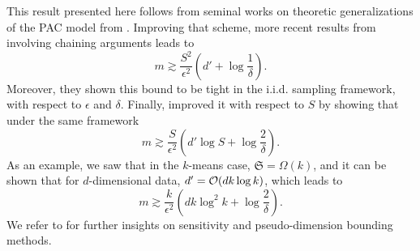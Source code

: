 This result presented here follows from seminal works on theoretic generalizations of the PAC model from \cite{haussler1992decisiontheoricgeneralizationofPACmodel}.
Improving that scheme, more recent results from \cite{li2001_improved_bound_sample_complexity} involving chaining arguments leads to
\begin{equation*}
	m \gtrsim \frac{S^{2}}{\epsilon^{2}} (d' + \log \frac{1}{\delta}).
\end{equation*}
Moreover, they shown this bound to be tight in the i.i.d. sampling framework, with respect to $\epsilon$ and $\delta$.
Finally, \cite{braverman2016coresetsota} improved it with respect to $S$ by showing that under the same framework
\begin{equation}
    \label{eqn__sota_coreset}
	m \gtrsim \frac{S}{\epsilon^{2}} (d' \log S + \log \frac{2}{\delta}).
\end{equation}
As an example, we saw that in the $k$-means case, $\mathfrak{S} = \Omega(k)$, and it can be shown that for $d$-dimensional data, ${d'} = \mathcal{O}(dk\log k)$, which leads to
\begin{equation*}
    m \gtrsim \frac{k}{\epsilon^{2}} (dk \log^2 k + \log \frac{2}{\delta}).
\end{equation*}
We refer to \cite{bachem2017coresetML} for further insights on sensitivity and pseudo-dimension bounding methods.
